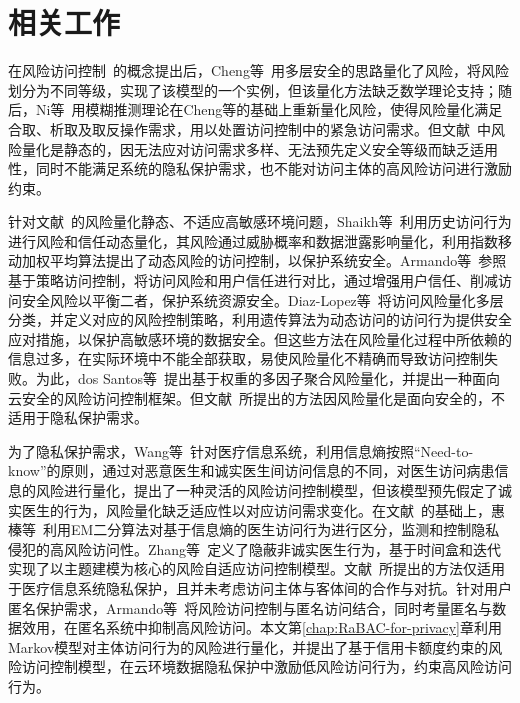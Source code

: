 \section{相关工作}

在风险访问控制~\cite{mcgraw2009risk}的概念提出后，Cheng等~\cite{cheng2007fuzzy}用多层安全的思路量化了风险，将风险划分为不同等级，实现了该模型的一个实例，但该量化方法缺乏数学理论支持；随后，Ni等~\cite{ni2010risk}用模糊推测理论在Cheng等的基础上重新量化风险，使得风险量化满足合取、析取及取反操作需求，用以处置访问控制中的紧急访问需求。但文献~\cite{cheng2007fuzzy,ni2010risk}中风险量化是静态的，因无法应对访问需求多样、无法预先定义安全等级而缺乏适用性，同时不能满足系统的隐私保护需求，也不能对访问主体的高风险访问进行激励约束。

针对文献~\cite{cheng2007fuzzy,ni2010risk}的风险量化静态、不适应高敏感环境问题，Shaikh等~\cite{shaikh2012dynamic}利用历史访问行为进行风险和信任动态量化，其风险通过威胁概率和数据泄露影响量化，利用指数移动加权平均算法提出了动态风险的访问控制，以保护系统安全。Armando等~\cite{armando2015balancing}参照基于策略访问控制，将访问风险和用户信任进行对比，通过增强用户信任、削减访问安全风险以平衡二者，保护系统资源安全。Diaz-Lopez等~\cite{diaz-lopez2016dynamic}将访问风险量化多层分类，并定义对应的风险控制策略，利用遗传算法为动态访问的访问行为提供安全应对措施，以保护高敏感环境的数据安全。但这些方法在风险量化过程中所依赖的信息过多，在实际环境中不能全部获取，易使风险量化不精确而导致访问控制失败。为此，dos Santos等~\cite{santos2016framework}提出基于权重的多因子聚合风险量化，并提出一种面向云安全的风险访问控制框架。但文献~\cite{shaikh2012dynamic,armando2015balancing,diaz-lopez2016dynamic,santos2016framework}所提出的方法因风险量化是面向安全的，不适用于隐私保护需求。

为了隐私保护需求，Wang等~\cite{wang2011quantified}针对医疗信息系统，利用信息熵按照“Need-to-know”的原则，通过对恶意医生和诚实医生间访问信息的不同，对医生访问病患信息的风险进行量化，提出了一种灵活的风险访问控制模型，但该模型预先假定了诚实医生的行为，风险量化缺乏适应性以对应访问需求变化。在文献~\cite{wang2011quantified}的基础上，惠榛等~\cite{hui2015risk}利用EM二分算法对基于信息熵的医生访问行为进行区分，监测和控制隐私侵犯的高风险访问性。Zhang等~\cite{zhang2018privacy}定义了隐蔽非诚实医生行为，基于时间盒和迭代实现了以主题建模为核心的风险自适应访问控制模型。文献~\cite{wang2011quantified,hui2015risk,zhang2018privacy}所提出的方法仅适用于医疗信息系统隐私保护，且并未考虑访问主体与客体间的合作与对抗。针对用户匿名保护需求，Armando等~\cite{armando2015risk}将风险访问控制与匿名访问结合，同时考量匿名与数据效用，在匿名系统中抑制高风险访问。本文第\ref{chap:RaBAC-for-privacy}章利用Markov模型对主体访问行为的风险进行量化，并提出了基于信用卡额度约束的风险访问控制模型，在云环境数据隐私保护中激励低风险访问行为，约束高风险访问行为。

